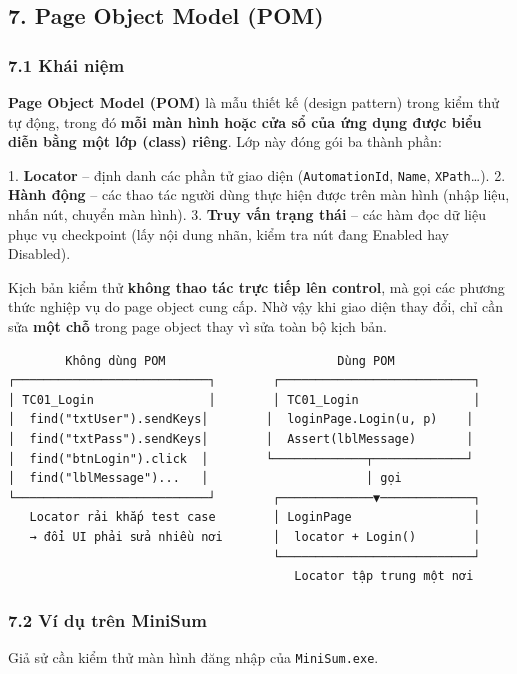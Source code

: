 \subsection{7. Page Object Model (POM)}

\subsubsection{7.1 Khái niệm}

\textbf{Page Object Model (POM)} là mẫu thiết kế (design pattern) trong kiểm thử tự động, trong đó \textbf{mỗi màn hình hoặc cửa sổ của ứng dụng được biểu diễn bằng một lớp (class) riêng}. Lớp này đóng gói ba thành phần:

1. \textbf{Locator} – định danh các phần tử giao diện (\texttt{AutomationId}, \texttt{Name}, \texttt{XPath}…).
2. \textbf{Hành động} – các thao tác người dùng thực hiện được trên màn hình (nhập liệu, nhấn nút, chuyển màn hình).
3. \textbf{Truy vấn trạng thái} – các hàm đọc dữ liệu phục vụ checkpoint (lấy nội dung nhãn, kiểm tra nút đang Enabled hay Disabled).

Kịch bản kiểm thử \textbf{không thao tác trực tiếp lên control}, mà gọi các phương thức nghiệp vụ do page object cung cấp. Nhờ vậy khi giao diện thay đổi, chỉ cần sửa \textbf{một chỗ} trong page object thay vì sửa toàn bộ kịch bản.

\begin{lstlisting}
        Không dùng POM                        Dùng POM
┌───────────────────────────┐        ┌───────────────────────────┐
│ TC01_Login                │        │ TC01_Login                │
│  find("txtUser").sendKeys│        │  loginPage.Login(u, p)    │
│  find("txtPass").sendKeys│        │  Assert(lblMessage)       │
│  find("btnLogin").click  │        └─────────────┬─────────────┘
│  find("lblMessage")...   │                      │ gọi
└───────────────────────────┘        ┌─────────────▼─────────────┐
   Locator rải khắp test case        │ LoginPage                 │
   → đổi UI phải sửa nhiều nơi       │  locator + Login()        │
                                     └───────────────────────────┘
                                        Locator tập trung một nơi
\end{lstlisting}


\subsubsection{7.2 Ví dụ trên MiniSum}

Giả sử cần kiểm thử màn hình đăng nhập của \texttt{MiniSum.exe}.


